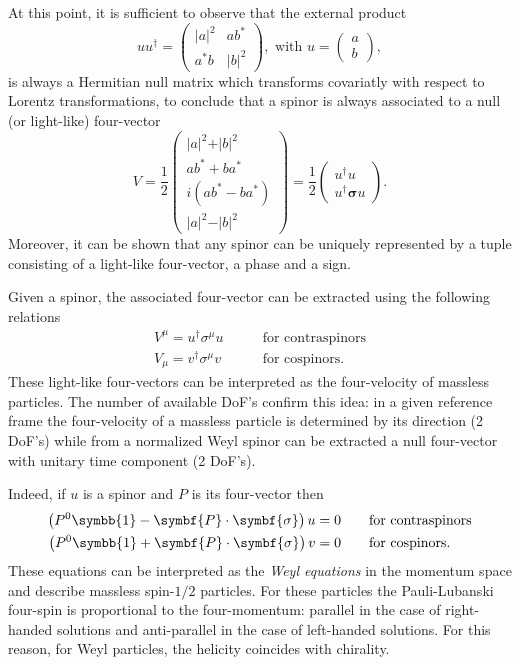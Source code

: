 At this point, it is sufficient to observe that the external product
\begin{equation}
  u u^\dagger = \begin{pmatrix} \vert a \vert^2 & a b^* \\ a^* b & \vert b \vert^2 \end{pmatrix} , \text{ with } u = \begin{pmatrix} a \\ b \end{pmatrix} ,
\end{equation}
is always a Hermitian null matrix which transforms covariatly with respect to Lorentz transformations, to conclude that a spinor is always associated to a null (or light-like) four-vector
\begin{equation}
  V = \frac{1}{2}
  \begin{pmatrix}
    \vert a \vert ^2 + \vert b \vert^2 \\
    a b^* + b a^* \\
    i ( a b^* - b a^* ) \\
    \vert a \vert^2 - \vert b \vert^2
  \end{pmatrix} = \frac{1}{2}
  \begin{pmatrix}
    u^\dagger u \\
    u^\dagger \symbf{\sigma} u 
  \end{pmatrix} .
\end{equation}
Moreover, it can be shown that any spinor can be uniquely represented by a tuple consisting of a light-like four-vector, a phase and a sign. 

Given a spinor, the associated four-vector can be extracted using the following relations 
\begin{align}
  V^\mu = u^\dagger \sigma^\mu u & \qquad \text{for contraspinors} \\
  \label{eq:fourvector_from_contraspinor}
  V_\mu = v^\dagger \sigma^\mu v & \qquad \text{for cospinors}. 
\end{align}
These light-like four-vectors can be interpreted as the four-velocity of massless particles. The number of available DoF's confirm this idea: in a given reference frame the four-velocity of a massless particle is determined by its direction (2 DoF's) while from a normalized Weyl spinor can be extracted a null four-vector with unitary time component (2 DoF's). 

Indeed, if $u$ is a spinor and $P$ is its four-vector then
\begin{align}
  \left(P^0 \symbb{1} - \symbf{P} \cdot \symbf{\sigma}\right) u = 0 & \qquad \text{for contraspinors} \\
  \left(P^0 \symbb{1} + \symbf{P} \cdot \symbf{\sigma}\right) v = 0 & \qquad \text{for cospinors} .
\end{align}
These equations can be interpreted as the \emph{Weyl equations} in the momentum space and describe massless spin-$1/2$ particles. For these particles the Pauli-Lubanski four-spin is proportional to the four-momentum: parallel in the case of right-handed solutions and anti-parallel in the case of left-handed solutions. For this reason, for Weyl particles, the helicity coincides with chirality. 

